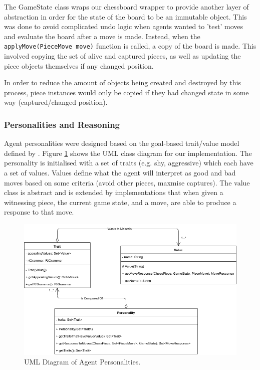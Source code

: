 \documentclass{article}
\begin{document}
The GameState class wraps our chessboard wrapper to provide another layer of abstraction in order for the state of the board to be an immutable object. This was done to avoid complicated undo logic when agents wanted to 'test' moves and evaluate the board after a move is made. Instead, when the \lstinline{applyMove(PieceMove move)} function is called, a copy of the board is made. This involved copying the set of alive and captured pieces, as well as updating the piece objects themselves if any changed position. 

In order to reduce the amount of objects being created and destroyed by this process, piece instances would only be copied if they had changed state in some way (captured/changed position). 

\subsubsection{Personalities and Reasoning}

Agent personalities were designed based on the goal-based trait/value model defined by \cite{hetrogenousagents}. Figure \ref{fig:personalityuml} shows the UML class diagram for our implementation. The personality is initialised with a set of traits (e.g. shy, aggressive) which each have a set of values. Values define what the agent will interpret as good and bad moves based on some criteria (avoid other pieces, maxmise captures). The value class is abstract and is extended by implementations that when given a witnessing piece, the current game state, and a move, are able to produce a response to that move.

\begin{figure}[]
	\centering
	\includegraphics[width=0.8\linewidth]{images/personality}
	\caption{UML Diagram of Agent Personalities.}
	\label{fig:personalityuml}
\end{figure}
\end{document}
